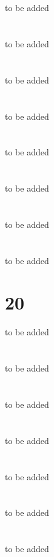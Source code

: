 \documentclass[12pt]{book}
\begin{document}
\section{}
to be added
\section{}
to be added
\section{}
to be added
\section{}
to be added
\section{}
to be added
\section{}
to be added
\section{}
to be added
\section{}
to be added
\section{20}
to be added
\section{}
to be added
\section{}
to be added
\section{}
to be added
\section{}
to be added
\section{}
to be added
\section{}
to be added
\end{document}

